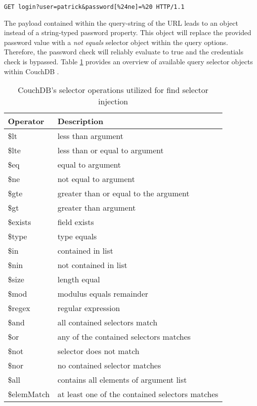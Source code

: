 \begin{lstlisting}[caption={Attack vector against CouchDB for speical key injection via the query-string parameter}, label={lst:FindSelectorInjectionAttack}]
GET login?user=patrick&password[%24ne]=%20 HTTP/1.1
\end{lstlisting}

The payload contained within the query-string of the URL leads to an object instead of a string-typed password property. This object will replace the provided password value with a \emph{not equals} selector object within the query options. Therefore, the password check will reliably evaluate to true and the credentials check is bypassed. Table \ref{tab:couchdb_affected_selectors} provides an overview of available query selector objects within CouchDB \cite{ASF2016a}. \\

\begin{table}[h]
 \sffamily
 \centering
 \begin{tabular}{ll}
  \textbf{Operator} & \textbf{Description} \\ \hline
  \$lt      & less than argument\\
  \$lte     & less than or equal to argument \\
  \$eq      & equal to argument \\
  \$ne      & not equal to argument \\
  \$gte     & greater than or equal to the argument \\
  \$gt      & greater than argument \\
  \$exists  & field exists \\
  \$type    & type equals \\
  \$in      & contained in list \\
  \$nin     & not contained in list \\
  \$size    & length equal \\
  \$mod     & modulus equals remainder \\
  \$regex   & regular expression \\
  \$and     & all contained selectors match \\
  \$or      & any of the contained selectors matches \\
  \$not     & selector does not match \\
  \$nor     & no contained selector matches \\
  \$all     & contains all elements of argument list \\ 
  \$elemMatch & at least one of the contained selectors matches \\
  \bottomrule 
 \end{tabular}
 \caption{CouchDB's selector operations utilized for find selector injection}
 \label{tab:couchdb_affected_selectors}
\end{table}

